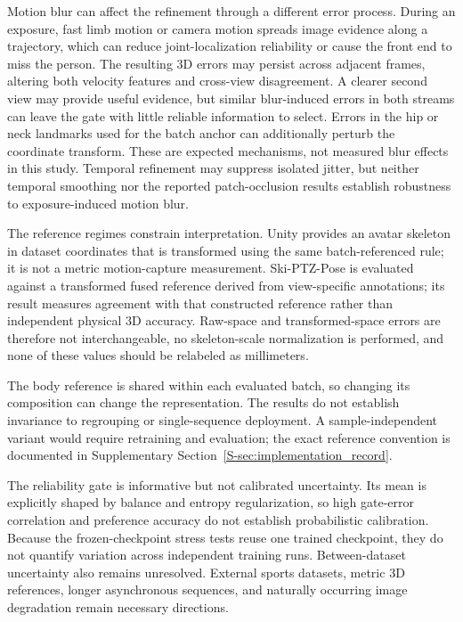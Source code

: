 \documentclass[preprint,12pt]{elsarticle}
\begin{document}
Motion blur can affect the refinement through a different error process. During an exposure, fast limb motion or camera motion spreads image evidence along a trajectory, which can reduce joint-localization reliability or cause the front end to miss the person. The resulting 3D errors may persist across adjacent frames, altering both velocity features and cross-view disagreement. A clearer second view may provide useful evidence, but similar blur-induced errors in both streams can leave the gate with little reliable information to select. Errors in the hip or neck landmarks used for the batch anchor can additionally perturb the coordinate transform. These are expected mechanisms, not measured blur effects in this study. Temporal refinement may suppress isolated jitter, but neither temporal smoothing nor the reported patch-occlusion results establish robustness to exposure-induced motion blur.

The reference regimes constrain interpretation. Unity provides an avatar skeleton in dataset coordinates that is transformed using the same batch-referenced rule; it is not a metric motion-capture measurement. Ski-PTZ-Pose is evaluated against a transformed fused reference derived from view-specific annotations; its result measures agreement with that constructed reference rather than independent physical 3D accuracy. Raw-space and transformed-space errors are therefore not interchangeable, no skeleton-scale normalization is performed, and none of these values should be relabeled as millimeters.

The body reference is shared within each evaluated batch, so changing its composition can change the representation. The results do not establish invariance to regrouping or single-sequence deployment. A sample-independent variant would require retraining and evaluation; the exact reference convention is documented in Supplementary Section~\ref{S-sec:implementation_record}.

The reliability gate is informative but not calibrated uncertainty. Its mean is explicitly shaped by balance and entropy regularization, so high gate-error correlation and preference accuracy do not establish probabilistic calibration. Because the frozen-checkpoint stress tests reuse one trained checkpoint, they do not quantify variation across independent training runs. Between-dataset uncertainty also remains unresolved. External sports datasets, metric 3D references, longer asynchronous sequences, and naturally occurring image degradation remain necessary directions.
\end{document}
